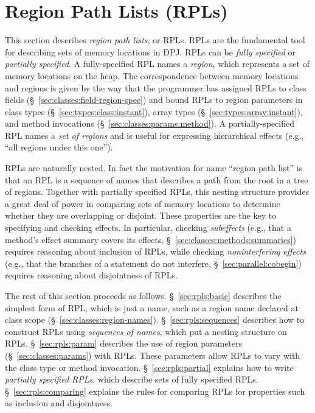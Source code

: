 \section{Region Path Lists (RPLs)%
\label{sec:rpls}}

This section describes \emph{region path lists}, or RPLs.  RPLs are
the fundamental tool for describing sets of memory locations in DPJ.
RPLs can be \emph{fully specified} or \emph{partially specified}.  A
fully-specified RPL names a \emph{region}, which represents a set of
memory locations on the heap. The correspondence between memory
locations and regions is given by the way that the programmer has
assigned RPLs to class fields (\S~\ref{sec:classes:field-region-spec})
and bound RPLs to region parameters in class types
(\S~\ref{sec:types:class:instant}), array types
(\S~\ref{sec:types:array:instant}), and method invocations
(\S~\ref{sec:classes:params:method}). A partially-specified RPL names
a \emph{set of regions} and is useful for expressing hierarchical
effects (e.g., ``all regions under this one'').

RPLs are naturally nested.  In fact the motivation for name ``region
path list'' is that an RPL is a sequence of names that describes a
path from the root in a tree of regions.  Together with partially
specified RPLs, this nesting structure provides a great deal of power
in comparing sets of memory locations to determine whether they are
overlapping or disjoint.  These properties are the key to specifying
and checking effects.  In particular, checking \emph{subeffects}
(e.g., that a method's effect summary covers its effects,
\S~\ref{sec:classes:methods:summaries}) requires reasoning about
inclusion of RPLs, while checking \emph{noninterfering effects} (e.g.,
that the branches of a  statement do not interfere,
\S~\ref{sec:parallel:cobegin}) requires reasoning about disjointness
of RPLs.

The rest of this section proceeds as follows.  \S~\ref{sec:rpls:basic}
describes the simplest form of RPL, which is just a name, such as a
region name declared at class scope
(\S~\ref{sec:classes:region-names}).  \S~\ref{sec:rpls:sequences}
describes how to construct RPLs using \emph{sequences of names}, which
put a nesting structure on RPLs.  \S~\ref{sec:rpls:param} describes
the use of region parameters (\S~\ref{sec:classes:params}) with RPLs.
These parameters allow RPLs to vary with the class type or method
invocation.  \S~\ref{sec:rpls:partial} explains how to write
\emph{partially specified RPLs}, which describe sets of fully
specified RPLs.  \S~\ref{sec:rpls:comparing} explains the rules for
comparing RPLs for properties such as inclusion and disjointness.

